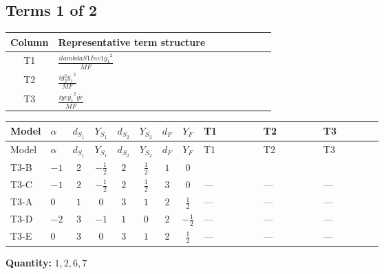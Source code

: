 \documentclass[8pt]{article}
\begin{document}
\begin{landscape}
\subsection*{Terms 1 of 2}
\begin{center}
\begin{tabular}{@{}c >{\raggedright\arraybackslash}p{0.82\linewidth}@{}}
\toprule
Column & Representative term structure \\
\midrule
T1 & \(\displaystyle \frac{i lambdaS1Inv1 \overline{y_{1}}^{2}}{MF}\) \\
\midrule
T2 & \(\displaystyle \frac{i g_{2}^{2} \overline{y_{1}}^{2}}{MF}\) \\
\midrule
T3 & \(\displaystyle \frac{i ye \overline{y_{1}}^{2} \overline{ye}}{MF}\) \\
\midrule
\bottomrule
\end{tabular}
\end{center}
\smallskip
\tiny
\begin{longtable}{@{}llcccccc >{\raggedright\arraybackslash}p{0.21\linewidth} >{\raggedright\arraybackslash}p{0.21\linewidth} >{\raggedright\arraybackslash}p{0.21\linewidth}@{}}
\toprule
Model & $\alpha$ & $d_{S_1}$ & $Y_{S_1}$ & $d_{S_2}$ & $Y_{S_2}$ & $d_F$ & $Y_F$ & T1 & T2 & T3 \\
\midrule
\endfirsthead
\toprule
Model & $\alpha$ & $d_{S_1}$ & $Y_{S_1}$ & $d_{S_2}$ & $Y_{S_2}$ & $d_F$ & $Y_F$ & T1 & T2 & T3 \\
\midrule
\endhead
T3-B & $-1$ & $2$ & $-\frac{1}{2}$ & $2$ & $\frac{1}{2}$ & $1$ & $0$ & \scriptsize\adjustbox{max width=\linewidth}{$\begin{gathered} \frac{i lambdaS1Inv1 \overline{y_{1}}^{2}}{4 MF}\end{gathered}$} & \scriptsize\adjustbox{max width=\linewidth}{$\begin{gathered} \frac{3 i g_{2}^{2} \overline{y_{1}}^{2}}{8 MF}\end{gathered}$} & \scriptsize\adjustbox{max width=\linewidth}{$\begin{gathered} - \frac{i ye \overline{y_{1}}^{2} \overline{ye}}{8 MF}\end{gathered}$} \\
\midrule
T3-C & $-1$ & $2$ & $-\frac{1}{2}$ & $2$ & $\frac{1}{2}$ & $3$ & $0$ & --- & --- & --- \\
\midrule
T3-A & $0$ & $1$ & $0$ & $3$ & $1$ & $2$ & $\frac{1}{2}$ & --- & --- & --- \\
\midrule
T3-D & $-2$ & $3$ & $-1$ & $1$ & $0$ & $2$ & $-\frac{1}{2}$ & --- & --- & --- \\
\midrule
T3-E & $0$ & $3$ & $0$ & $3$ & $1$ & $2$ & $\frac{1}{2}$ & --- & --- & --- \\
\midrule
\bottomrule
\end{longtable}
\clearpage
\noindent\textbf{Quantity: }$\mathrm{1,2,6,7}$\par\smallskip

\end{landscape}
\end{document}
